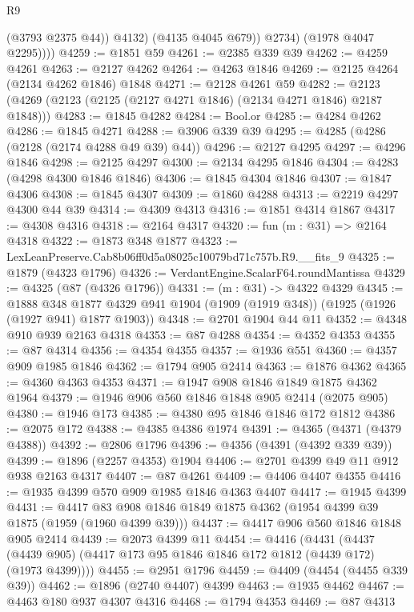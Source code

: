 \begin{lexlean}{R9}
\begin{coremodule}
                  (@3793 @2375 @44))
                @4132)
              (@4135 @4045 @679))
            @2734)
          (@1978 @4047 @2295))))
@4259 := @1851 @59
@4261 := @2385 @339 @39
@4262 := @4259 @4261
@4263 := @2127 @4262
@4264 := @4263 @1846
@4269 := @2125 @4264 (@2134 @4262 @1846) @1848
@4271 := @2128 @4261 @59
@4282 := @2123 (@4269 (@2123 (@2125 (@2127 @4271 @1846) (@2134 @4271 @1846) @2187 @1848)))
@4283 := @1845 @4282
@4284 := Bool.or
@4285 := @4284 @4262
@4286 := @1845 @4271
@4288 := @3906 @339 @39
@4295 := @4285 (@4286 (@2128 (@2174 @4288 @49 @39) @44))
@4296 := @2127 @4295
@4297 := @4296 @1846
@4298 := @2125 @4297
@4300 := @2134 @4295 @1846
@4304 := @4283 (@4298 @4300 @1846 @1846)
@4306 := @1845 @4304 @1846
@4307 := @1847 @4306
@4308 := @1845 @4307
@4309 := @1860 @4288
@4313 := @2219 @4297 @4300 @44 @39
@4314 := @4309 @4313
@4316 := @1851 @4314 @1867
@4317 := @4308 @4316
@4318 := @2164 @4317
@4320 := fun (m : @31) => @2164 @4318
@4322 := @1873 @348 @1877
@4323 := LexLeanPreserve.Cab8b06ff0d5a08025c10079bd71c757b.R9.__fits_9
@4325 := @1879 (@4323 @1796)
@4326 := VerdantEngine.ScalarF64.roundMantissa
@4329 := @4325 (@87 (@4326 @1796))
@4331 := (m : @31) -> @4322 @4329
@4345 := @1888
    @348
    @1877
    @4329
    @941
    @1904
    (@1909 (@1919 @348))
    (@1925 (@1926 (@1927 @941) @1877 @1903))
@4348 := @2701 @1904 @44 @11
@4352 := @4348 @910 @939 @2163 @4318
@4353 := @87 @4288
@4354 := @4352 @4353
@4355 := @87 @4314
@4356 := @4354 @4355
@4357 := @1936 @551
@4360 := @4357 @909 @1985 @1846
@4362 := @1794 @905 @2414
@4363 := @1876 @4362
@4365 := @4360 @4363 @4353
@4371 := @1947 @908 @1846 @1849 @1875 @4362 @1964
@4379 := @1946 @906 @560 @1846 @1848 @905 @2414 (@2075 @905)
@4380 := @1946 @173
@4385 := @4380 @95 @1846 @1846 @172 @1812
@4386 := @2075 @172
@4388 := @4385 @4386 @1974
@4391 := @4365 (@4371 (@4379 @4388))
@4392 := @2806 @1796
@4396 := @4356 (@4391 (@4392 @339 @39))
@4399 := @1896 (@2257 @4353) @1904
@4406 := @2701 @4399 @49 @11 @912 @938 @2163 @4317
@4407 := @87 @4261
@4409 := @4406 @4407 @4355
@4416 := @1935 @4399 @570 @909 @1985 @1846 @4363 @4407
@4417 := @1945 @4399
@4431 := @4417 @83 @908 @1846 @1849 @1875 @4362 (@1954 @4399 @39 @1875 (@1959 (@1960 @4399 @39)))
@4437 := @4417 @906 @560 @1846 @1848 @905 @2414
@4439 := @2073 @4399 @11
@4454 := @4416
    (@4431 (@4437 (@4439 @905) (@4417 @173 @95 @1846 @1846 @172 @1812 (@4439 @172) (@1973 @4399))))
@4455 := @2951 @1796
@4459 := @4409 (@4454 (@4455 @339 @39))
@4462 := @1896 (@2740 @4407) @4399
@4463 := @1935 @4462
@4467 := @4463 @180 @937 @4307 @4316
@4468 := @1794 @4353
@4469 := @87 @4313

\end{coremodule}
\end{lexlean}
